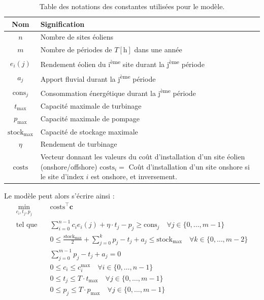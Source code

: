 \documentclass{article}
\newcommand{\unit}[1]{[\mathrm{#1}]}
\begin{document}
\begin{table}[h!]
    \centering
    \renewcommand{\arraystretch}{1.5}%
    \begin{tabular}{|c || p{14cm} |} 
        \hline
        Nom & Signification\\
        \hline\hline
        $n$ & Nombre de sites éoliens \\
        $m$ & Nombre de périodes de $T \unit{h}$ dans une année\\
        $e_i(j)$ & Rendement éolien du i\textsuperscript{ème} site durant la j\textsuperscript{ème} période\\
        $a_j$ & Apport fluvial durant la j\textsuperscript{ème} période\\
        $\mathrm{cons}_j$ & Consommation énergétique durant la j\textsuperscript{ème} période\\
        $t_\mathrm{max}$ & Capacité maximale de turbinage\\
        $p_\mathrm{max}$ & Capacité maximale de pompage\\
        $\mathrm{stock}_\mathrm{max}$ & Capacité de stockage maximale\\
        $\eta$ & Rendement de turbinage\\
        $\mathrm{costs}$ & Vecteur donnant les valeurs du coût d'installation d'un site éolien  (onshore/offshore) \newline $\mathrm{costs}_i = $ Coût d'installation d'un site onshore si le site d'index $i$ est onshore, et inversement.\\  
        \hline
    \end{tabular}
    \caption{Table des notations des constantes utilisées pour le modèle.}
    \label{table:notations_constantes}
\end{table}

\noindent
Le modèle peut alors s'écrire ainsi :
\begin{align}
    \min_{c_{i},t_j,p_j} \quad &\mathrm{costs}^\intercal\mathbf{c} \nonumber\\
    \textrm{tel que} \quad & \sum_{i=0}^{n-1} c_i e_i(j) + \eta \cdot t_j - p_j \ge \mathrm{cons}_j \quad \forall j \in  \{ 0, \ldots, m-1 \}\label{eq:4A_contr1}\\
    & 0 \le \frac{\mathrm{stock}_\mathrm{max}}{2}  + \sum_{j=0}^{k} p_j - t_j + a_j \le  \mathrm{stock}_\mathrm{max} \quad \forall k \in \{ 0, \ldots, m-2 \}\label{eq:4A_contr2}\\
    & \sum_{j=0}^{m-1} p_j - t_j + a_j = 0 \label{eq:4A_contr3}\\
    & 0 \le c_i \le c_i^\mathrm{max} \quad \forall i \in  \{ 0, \ldots, n-1 \}  \label{eq:4A_contr4}\\
    & 0 \le t_j \le T \cdot t_\mathrm{max} \quad \forall j \in  \{ 0, \ldots, m-1 \}  \label{eq:4A_contr5}\\
    & 0 \le p_j \le T \cdot p_\mathrm{max} \quad \forall j \in  \{ 0, \ldots, m-1 \} \label{eq:4A_contr6}
\end{align}
\end{document}
